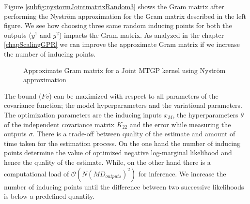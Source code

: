 Figure \ref{subfig:nystormJointmatrixRandom3} shows the Gram matrix after performing the Nystr\"{o}m approximation for the Gram matrix described in the left figure. We see how choosing three same random inducing points for both the outputs ($y^1$ and $y^2$) impacts the Gram matrix. As analyzed in the chapter \ref{chapScalingGPR} we can improve the approximate Gram matrix if we increase the number of inducing points. 

\begin{figure}[!ht]
  \centering
  \quad
  \caption{Approximate Gram matrix for a Joint MTGP kernel using Nystr\"{o}m approximation}
\end{figure}

The bound ($Fv$) can be maximized with respect to all parameters of the covariance function; the model hyperparameters and the variational parameters. The optimization parameters are the inducing inputs \(x_{M}\), the hyperparameters \(\theta\) of the independent covariance matrix \(K_{22}\) and the error while measuring the outputs \(\sigma\). There is a trade-off between quality of the estimate and amount of time taken for the estimation process. On the one hand the number of inducing points determine the value of optimized negative log-marginal likelihood and hence the quality of the estimate. While, on the other hand there is a computational load of \(\mathcal{O}\left ( N(MD_{outputs})^{2} \right )\) for inference. We increase the number of inducing points until the difference between two successive likelihoods is below a predefined quantity.   

